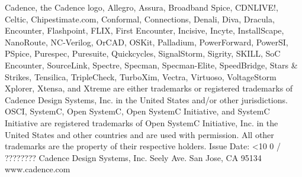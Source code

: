 \documentclass[twoside]{book}
\newcommand{\+}{\discretionary{\mbox{\scriptsize$\hookleftarrow$}}{}{}}
\newcommand{\clearemptydoublepage}{%
  \newpage{\pagestyle{empty}\cleardoublepage}%
}
\newcommand{\twodigits}[1]{%
  \ifnum#1<10 0#1\else #1\fi
}
\begin{document}
\begin{titlepage}
{\vspace*{0.2cm}
\newline Cadence, the Cadence logo, Allegro, Assura, Broadband Spice, CDNLIVE!, Celtic, Chipestimate.com, Conformal, Connections, Denali, Diva, Dracula, Encounter, Flashpoint, FLIX, First Encounter, Incisive, Incyte, InstallScape, NanoRoute, NC-Verilog, OrCAD, OSKit, Palladium, PowerForward, PowerSI, PSpice, Purespec, Puresuite, Quickcycles, SignalStorm, Sigrity, SKILL, SoC Encounter, SourceLink, Spectre, Specman, Specman-Elite, SpeedBridge, Stars \& Strikes, Tensilica, TripleCheck, TurboXim, Vectra, Virtuoso, VoltageStorm Xplorer, Xtensa, and Xtreme are either trademarks or registered trademarks of Cadence Design Systems, Inc. in the United States and/or other jurisdictions. 
OSCI, SystemC, Open SystemC, Open SystemC Initiative, and SystemC Initiative are registered trademarks of Open SystemC Initiative, Inc. in the United States and other countries and are used with permission. All other trademarks are the property of their respective holders.
\vspace*{2.5cm}
\newline Issue Date: \twodigits{\the\month}/{\the\year}
\newline ????????
\vspace*{0.4cm}
\newline
\vspace*{0.5cm}
\newline Cadence Design Systems, Inc.
 Seely Ave.
\newline San Jose, CA 95134
\newline www.cadence.com
}
\end{titlepage}
\clearemptydoublepage

{}
\tableofcontents
\clearemptydoublepage
{}
\listoftables
\clearemptydoublepage

\hypersetup{pageanchor=true}

\end{document}
